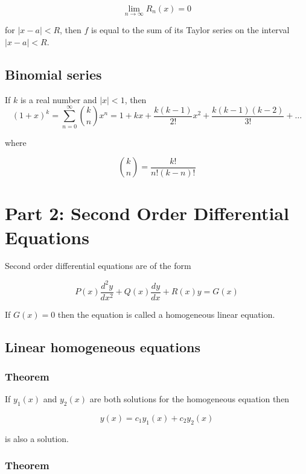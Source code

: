 \documentclass[a4paper]{article}
\begin{document}
\begin{equation}
    \lim_{n\rightarrow\infty}R_n(x)=0
\end{equation}

for $|x-a|<R$, then $f$ is equal to the sum of its Taylor series on the interval $|x-a|<R$.

\subsection{Binomial series}
If $k$ is a real number and $|x|<1$, then
\begin{equation}
    (1+x)^k=\sum_{n=0}^{\infty}\binom{k}{n}x^n=1+kx+\frac{k(k-1)}{2!}x^2+\frac{k(k-1)(k-2)}{3!}+\dots
\end{equation}

where 

\begin{equation}
    \binom{k}{n}=\frac{k!}{n!(k-n)!}
\end{equation}

\section{Part 2: Second Order Differential Equations}

Second order differential equations are of the form

\begin{equation}
    P(x)\frac{d^2y}{dx^2}+Q(x)\frac{dy}{dx}+R(x)y=G(x)
\end{equation}

If $G(x)=0$ then the equation is called a homogeneous linear equation.

\subsection{Linear homogeneous equations}

\subsubsection*{Theorem}

If $y_1(x)$ and $y_2(x)$ are both solutions for the homogeneous equation then 

\begin{equation}
    y(x)=c_1y_1(x)+c_2y_2(x)
\end{equation}

is also a solution.

\subsubsection*{Theorem}
\end{document}
